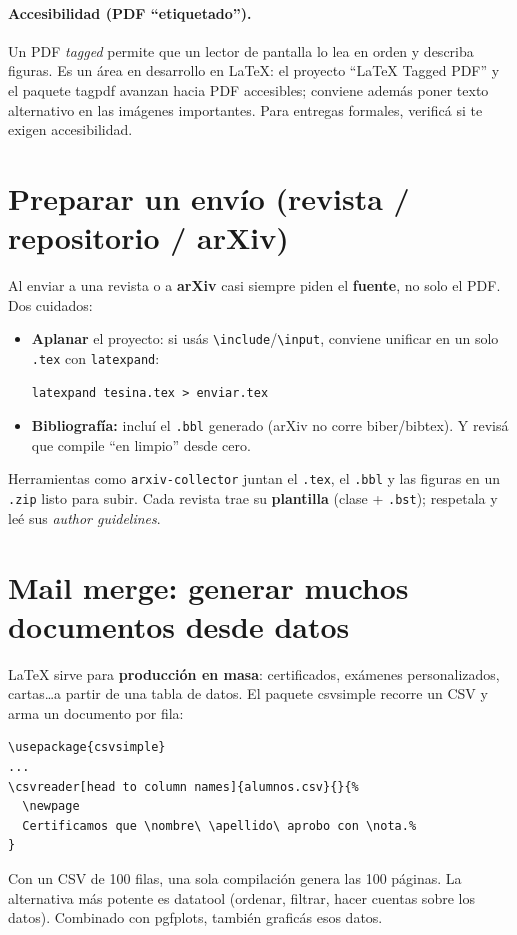 \documentclass[11pt,a4paper]{article}
\newcommand{\C}[1]{\texttt{\textbackslash #1}}
\newcommand{\pkg}[1]{\textsf{#1}}
\begin{document}
\paragraph{Accesibilidad (PDF \enquote{etiquetado}).} Un PDF \emph{tagged} permite
que un lector de pantalla lo lea en orden y describa figuras. Es un área en
desarrollo en \LaTeX: el proyecto \enquote{\LaTeX{} Tagged PDF} y el paquete
\pkg{tagpdf} avanzan hacia PDF accesibles; conviene además poner texto
alternativo en las imágenes importantes. Para entregas formales, verificá si te
exigen accesibilidad.

\section{Preparar un envío (revista / repositorio / arXiv)}
Al enviar a una revista o a \textbf{arXiv} casi siempre piden el \textbf{fuente},
no solo el PDF. Dos cuidados:
\begin{itemize}[leftmargin=*]
  \item \textbf{Aplanar} el proyecto: si usás \C{include}/\C{input}, conviene
        unificar en un solo \texttt{.tex} con \texttt{latexpand}:
\begin{lstlisting}
latexpand tesina.tex > enviar.tex
\end{lstlisting}
  \item \textbf{Bibliografía:} incluí el \texttt{.bbl} generado (arXiv no corre
        biber/bibtex). Y revisá que compile \enquote{en limpio} desde cero.
\end{itemize}
Herramientas como \texttt{arxiv-collector} juntan el \texttt{.tex}, el
\texttt{.bbl} y las figuras en un \texttt{.zip} listo para subir. Cada
revista trae su \textbf{plantilla} (clase + \texttt{.bst}); respetala y leé sus
\emph{author guidelines}.

\section{Mail merge: generar muchos documentos desde datos}
\LaTeX{} sirve para \textbf{producción en masa}: certificados, exámenes
personalizados, cartas\dots a partir de una tabla de datos. El paquete
\pkg{csvsimple} recorre un CSV y arma un documento por fila:
\begin{lstlisting}[style=tex]
\usepackage{csvsimple}
...
\csvreader[head to column names]{alumnos.csv}{}{%
  \newpage
  Certificamos que \nombre\ \apellido\ aprobo con \nota.%
}
\end{lstlisting}
Con un CSV de 100 filas, una sola compilación genera las 100 páginas. La
alternativa más potente es \pkg{datatool} (ordenar, filtrar, hacer cuentas sobre
los datos). Combinado con \pkg{pgfplots}, también graficás esos datos.
\end{document}
